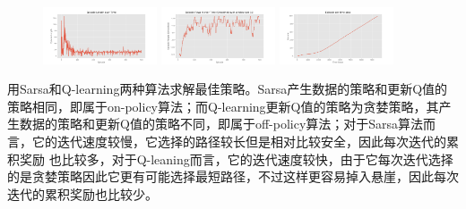 \documentclass{ctexart}
\begin{document}
\begin{figure}[H]
    \centering
    \includegraphics[width=0.3\textwidth]{q1.png}
    \includegraphics[width=0.3\textwidth]{q2.png}
    \includegraphics[width=0.3\textwidth]{q3.png}
\end{figure}

用Sarsa和Q-learning两种算法求解最佳策略。Sarsa产生数据的策略和更新Q值的策略相同，即属于on-policy算法；而Q-learning更新Q值的策略为贪婪策略，其产生数据的策略和更新Q值的策略不同，即属于off-policy算法；对于Sarsa算法而言，它的迭代速度较慢，它选择的路径较长但是相对比较安全，因此每次迭代的累积奖励
也比较多，对于Q-leaning而言，它的迭代速度较快，由于它每次迭代选择的是贪婪策略因此它更有可能选择最短路径，不过这样更容易掉入悬崖，因此每次迭代的累积奖励也比较少。
\end{document}
